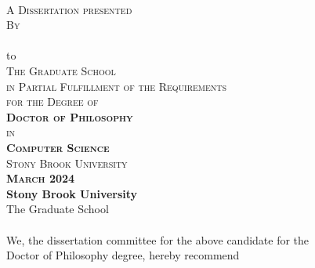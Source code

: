 \begin{center}
    
    \thispagestyle{empty}
    {\large \textsc{\textbf{\ttitle}}}  \\
    \vspace{0.9cm}
    \textsc{A Dissertation presented}  \\
    \vspace{0.45cm}
    \textsc{By}  \\
    \vspace{0.45cm}
    {\large \textsc{\textbf{\authorname}}}  \\
    \vspace{0.9cm}
    to  \\
    \vspace{0.45cm}
    \textsc{The Graduate School}  \\
    \vspace{0.45cm}
    \textsc{in Partial Fulfillment of the Requirements}  \\
    \vspace{0.45cm}
    \textsc{for the Degree of}  \\
    \vspace{0.45cm}
    \textsc{\textbf{Doctor of Philosophy}}  \\
    \vspace{0.45cm}
    \textsc{in}  \\
    \vspace{0.45cm}
    \textsc{\textbf{Computer Science}}  \\
    \vspace{1.2cm}
    \textsc{Stony Brook University}  \\
    \vspace{1.2cm}
    \textsc{\textbf{March 2024}}  \\
    \eject 
    \setcounter{page}{2}
    {\large \textbf{Stony Brook University}}  \\
    \vspace{0.25cm}
    The Graduate School  \\
    \vspace{0.5cm}
    \textbf{\authorname}  \\
    \vspace{0.5cm}
    {We}, the dissertation committee for the above candidate for the  \\
    \vspace{0.25cm}
    Doctor of Philosophy degree, hereby recommend  \\

\end{center}
